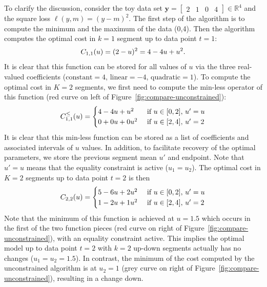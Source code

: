 \documentclass{article}
\newcommand{\RR}{\mathbb R}
\begin{document}
To clarify the discussion, consider the 
toy data set $\mathbf y= \left[
\begin{array}{cccccc}
  2 & 1 & 0 & 4
\end{array}
\right] \in\RR^4$ and the square loss $\ell(y,m)=(y-m)^2$. The first
step of the algorithm is to compute the minimum and the maximum of the
data (0,4). Then the algorithm computes the optimal cost in $k=1$
segment up to data point $t=1$:
\begin{equation}
  C_{1,1}(u) = (2-u)^2=4 - 4u + u^2.
\end{equation}
It is clear that this function can be stored for all values of $u$ via
the three real-valued coefficients ($\text{constant}=4$,
$\text{linear}=-4$, $\text{quadratic}=1$). To compute the optimal cost
in $K=2$ segments, we first need to compute the min-less operator of
this function (red curve on left of Figure~\ref{fig:compare-unconstrained}):
\begin{equation}
  C_{1,1}^\leq(u) =
  \begin{cases}
    4 - 4u + u^2 &\text{ if }u\in[0,2],\, u'=u\\
    0 + 0u + 0u^2 & \text{ if }u\in[2,4],\,  u'=2
  \end{cases}
\end{equation}
It is clear that this min-less function can be stored as a list of
coefficients and associated intervals of $u$ values.  
In addition, to
facilitate recovery of the optimal parameters, we store the previous
segment mean $u'$ and endpoint. Note that $u'=u$ means that the
equality constraint is active ($u_1=u_2$). The optimal cost in $K=2$
segments up to data point $t=2$ is then
\begin{equation}
  C_{2,2}(u) = 
  \begin{cases}
    5 - 6u + 2u^2 &\text{ if }u\in[0,2],\,  u'=u\\
    1 - 2u + 1u^2 &\text{ if }u\in[2,4],\,  u'=2
  \end{cases}
\end{equation}
Note that the minimum of this function is achieved at $u=1.5$ which
occurs in the first of the two function pieces (red curve on right of
Figure~\ref{fig:compare-unconstrained}), with an equality constraint
active. This implies the optimal model up to data point $t=2$ with
$k=2$ up-down segments actually has no changes ($u_1=u_2=1.5$). In contrast, the minimum of the cost computed by the unconstrained algorithm is at $u_2=1$ (grey curve on right of
Figure~\ref{fig:compare-unconstrained}), resulting in a change down.
\end{document}
